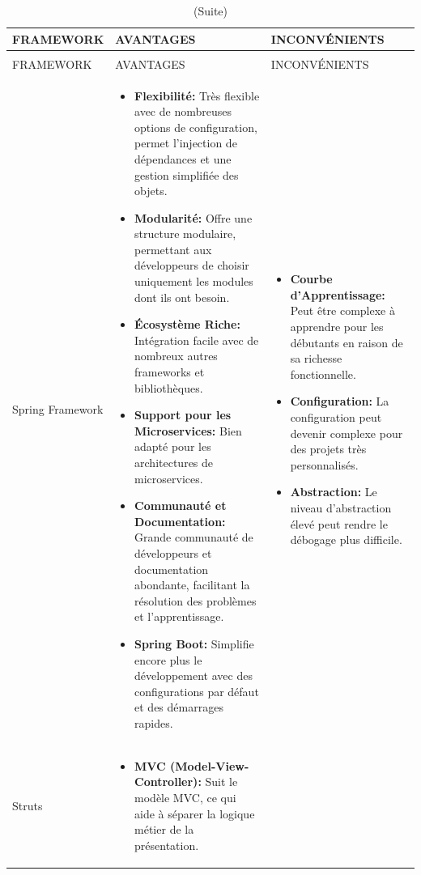 \documentclass[12pt]{report}
\begin{document}
				\begin{longtable}{|p{3cm}|p{5.5cm}|p{5.5cm}|} 
						\caption{Comparaison entre Spring Framework et Struts.} 
						\label{tab:tableau 16}\\ 
						\hline 
						FRAMEWORK & AVANTAGES & INCONVÉNIENTS\\ 
						\hline 
						\endfirsthead 	
						\caption[]{(Suite)}\\ 
						\hline 
						FRAMEWORK & AVANTAGES & INCONVÉNIENTS\\ 
						\hline 
						\endhead
						Spring Framework&
						\begin{itemize}
							\item \textbf{Flexibilité:} Très flexible avec de nombreuses options de configuration, permet l'injection de dépendances et une gestion simplifiée des objets.
							\item \textbf{Modularité:} Offre une structure modulaire, permettant aux développeurs de choisir uniquement les modules dont ils ont besoin.
							\item \textbf{Écosystème Riche:} Intégration facile avec de nombreux autres frameworks et bibliothèques.
							\item \textbf{Support pour les Microservices:} Bien adapté pour les architectures de microservices.
							\item \textbf{Communauté et Documentation:} Grande communauté de développeurs et documentation abondante, facilitant la résolution des problèmes et l'apprentissage.
							\item \textbf{Spring Boot:} Simplifie encore plus le développement avec des configurations par défaut et des démarrages rapides.
						\end{itemize}
						&
						\begin{itemize}
							\item \textbf{Courbe d'Apprentissage:} Peut être complexe à apprendre pour les débutants en raison de sa richesse fonctionnelle.
							\item \textbf{Configuration:} La configuration peut devenir complexe pour des projets très personnalisés.
							\item \textbf{Abstraction:} Le niveau d'abstraction élevé peut rendre le débogage plus difficile.
						\end{itemize}\\						
						\hline
						Struts&
						\begin{itemize}
							\item \textbf{MVC (Model-View-Controller):} Suit le modèle MVC, ce qui aide à séparer la logique métier de la présentation.

\end{itemize}
\end{longtable}
\end{document}
